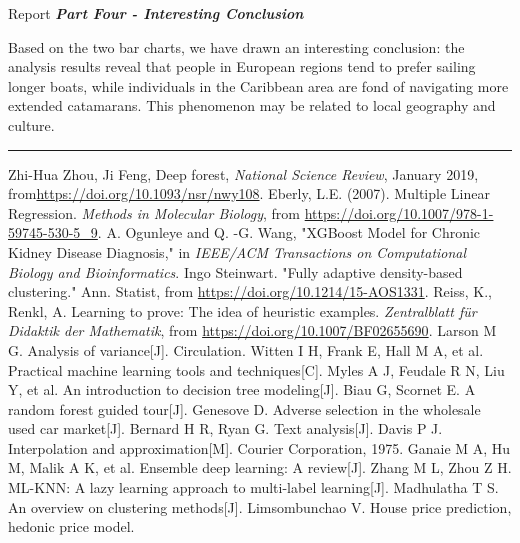 \documentclass[12pt]{article}  %
\begin{document}
\begin{letter}{Report}
\noindent \textbf{\emph{Part Four - Interesting Conclusion}}

Based on the two bar charts, we have drawn an interesting conclusion: the analysis results reveal that people in European regions tend to prefer sailing longer boats, while individuals in the Caribbean area are fond of navigating more extended catamarans. This phenomenon may be related to local geography and culture.

\noindent\rule[0.25\baselineskip]{\textwidth}{2pt} 
\end{letter}

\clearpage

\begin{thebibliography}{99}
 Zhi-Hua Zhou, Ji Feng, Deep forest, \emph{National Science Review}, January 2019, from\url{https://doi.org/10.1093/nsr/nwy108}.
 Eberly, L.E. (2007). Multiple Linear Regression. \emph{Methods in Molecular Biology}, from \url{https://doi.org/10.1007/978-1-59745-530-5_9}.
 A. Ogunleye and Q. -G. Wang, "XGBoost Model for Chronic Kidney Disease Diagnosis," in \emph{IEEE/ACM Transactions on Computational Biology and Bioinformatics}.
 Ingo Steinwart. "Fully adaptive density-based clustering." Ann. Statist, from \url{https://doi.org/10.1214/15-AOS1331}.
 Reiss, K., Renkl, A. Learning to prove: The idea of heuristic examples. \emph{Zentralblatt für Didaktik der Mathematik}, from \url{https://doi.org/10.1007/BF02655690}.
 Larson M G. Analysis of variance[J]. Circulation.
 Witten I H, Frank E, Hall M A, et al. Practical machine learning tools and techniques[C].
 Myles A J, Feudale R N, Liu Y, et al. An introduction to decision tree modeling[J].
 Biau G, Scornet E. A random forest guided tour[J].
 Genesove D. Adverse selection in the wholesale used car market[J].
 Bernard H R, Ryan G. Text analysis[J]. 
 Davis P J. Interpolation and approximation[M]. Courier Corporation, 1975.
 Ganaie M A, Hu M, Malik A K, et al. Ensemble deep learning: A review[J].
 Zhang M L, Zhou Z H. ML-KNN: A lazy learning approach to multi-label learning[J].
 Madhulatha T S. An overview on clustering methods[J].
 Limsombunchao V. House price prediction, hedonic price model.
\end{thebibliography}
\end{document}
